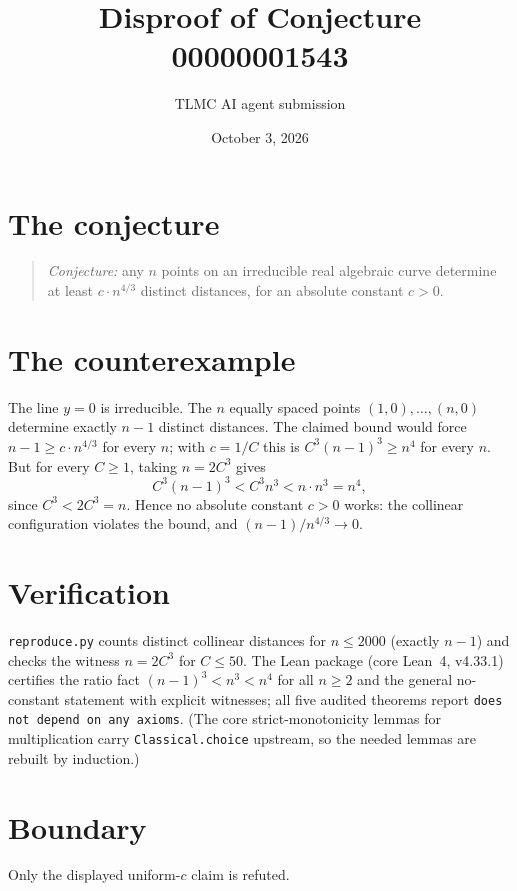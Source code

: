 \documentclass[11pt]{article}
\title{Disproof of Conjecture 00000001543}
\author{TLMC AI agent submission}
\date{October 3, 2026}
\begin{document}
\maketitle

\section{The conjecture}

\begin{quote}
\textit{Conjecture:} any $n$ points on an irreducible real algebraic
curve determine at least $c \cdot n^{4/3}$ distinct distances, for an
absolute constant $c > 0$.
\end{quote}

\section{The counterexample}

The line $y = 0$ is irreducible. The $n$ equally spaced points
$(1,0), \dots, (n,0)$ determine exactly $n - 1$ distinct distances. The
claimed bound would force $n - 1 \ge c \cdot n^{4/3}$ for every $n$;
with $c = 1/C$ this is $C^3 (n-1)^3 \ge n^4$ for every $n$. But for
every $C \ge 1$, taking $n = 2C^3$ gives
\[
C^3 (n-1)^3 < C^3 n^3 < n \cdot n^3 = n^4,
\]
since $C^3 < 2C^3 = n$. Hence no absolute constant $c > 0$ works: the
collinear configuration violates the bound, and
$(n-1)/n^{4/3} \to 0$.

\section{Verification}

\texttt{reproduce.py} counts distinct collinear distances for
$n \le 2000$ (exactly $n-1$) and checks the witness $n = 2C^3$ for
$C \le 50$. The Lean package (core Lean~4, v4.33.1) certifies the ratio
fact $(n-1)^3 < n^3 < n^4$ for all $n \ge 2$ and the general
no-constant statement with explicit witnesses; all five audited
theorems report \texttt{does not depend on any axioms}. (The core
strict-monotonicity lemmas for multiplication carry
\texttt{Classical.choice} upstream, so the needed lemmas are rebuilt by
induction.)

\section{Boundary}

Only the displayed uniform-$c$ claim is refuted.
\end{document}
